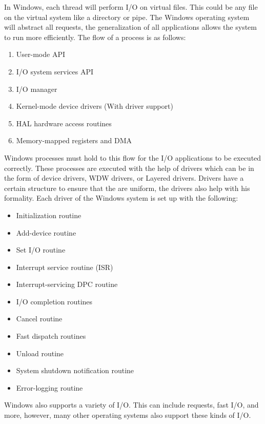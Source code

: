 \documentclass[onecolumn, draftclsnofoot,10pt, compsoc]{IEEEtran}
\begin{document}
In Windows, each thread will perform I/O on virtual files. This could be any file on the virtual system like a directory or pipe. The Windows operating system will abstract all requests, the generalization of all applications allows the system to run more efficiently. The flow of a process is as follows:
\begin{enumerate}
  \item User-mode API
  \item I/O system services API
  \item I/O manager
  \item Kernel-mode device drivers (With driver support)
  \item HAL hardware access routines
  \item Memory-mapped registers and DMA
\end{enumerate}
Windows processes must hold to this flow for the I/O applications to be executed correctly. These processes are executed with the help of drivers which can be in the form of device drivers, WDW drivers, or Layered drivers. Drivers have a certain structure to ensure that the are uniform, the drivers also help with his formality. Each driver of the Windows system is set up with the following\cite{3}:
 \begin{itemize}
  \item Initialization routine
  \item Add-device routine 
  \item Set I/O routine
  \item Interrupt service routine (ISR)
  \item Interrupt-servicing DPC routine
  \item I/O completion routines
  \item Cancel routine
  \item Fast dispatch routines
  \item Unload routine
  \item System shutdown notification routine
  \item Error-logging routine 
\end{itemize}
Windows also supports a variety of I/O. This can include requests, fast I/O, and more, however, many other operating systems also support these kinds of I/O\cite{3}.
\end{document}

